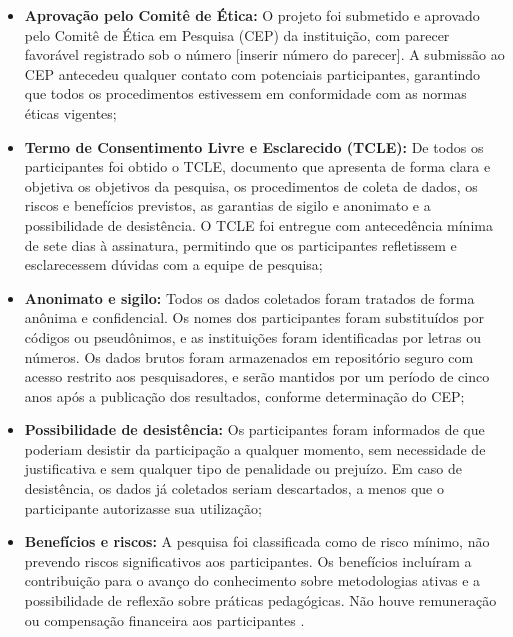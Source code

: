 \begin{itemize}
    \item \textbf{Aprovação pelo Comitê de Ética:} O projeto foi submetido e aprovado pelo Comitê de Ética em Pesquisa (CEP) da instituição, com parecer favorável registrado sob o número [inserir número do parecer]. A submissão ao CEP antecedeu qualquer contato com potenciais participantes, garantindo que todos os procedimentos estivessem em conformidade com as normas éticas vigentes;
    \item \textbf{Termo de Consentimento Livre e Esclarecido (TCLE):} De todos os participantes foi obtido o TCLE, documento que apresenta de forma clara e objetiva os objetivos da pesquisa, os procedimentos de coleta de dados, os riscos e benefícios previstos, as garantias de sigilo e anonimato e a possibilidade de desistência. O TCLE foi entregue com antecedência mínima de sete dias à assinatura, permitindo que os participantes refletissem e esclarecessem dúvidas com a equipe de pesquisa;
    \item \textbf{Anonimato e sigilo:} Todos os dados coletados foram tratados de forma anônima e confidencial. Os nomes dos participantes foram substituídos por códigos ou pseudônimos, e as instituições foram identificadas por letras ou números. Os dados brutos foram armazenados em repositório seguro com acesso restrito aos pesquisadores, e serão mantidos por um período de cinco anos após a publicação dos resultados, conforme determinação do CEP;
    \item \textbf{Possibilidade de desistência:} Os participantes foram informados de que poderiam desistir da participação a qualquer momento, sem necessidade de justificativa e sem qualquer tipo de penalidade ou prejuízo. Em caso de desistência, os dados já coletados seriam descartados, a menos que o participante autorizasse sua utilização;
    \item \textbf{Benefícios e riscos:} A pesquisa foi classificada como de risco mínimo, não prevendo riscos significativos aos participantes. Os benefícios incluíram a contribuição para o avanço do conhecimento sobre metodologias ativas e a possibilidade de reflexão sobre práticas pedagógicas. Não houve remuneração ou compensação financeira aos participantes \cite{SANTOS2024}.
\end{itemize}

